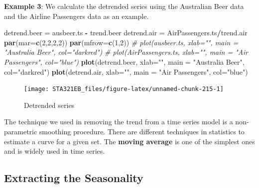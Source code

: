 \documentclass[
]{book}
\newenvironment{Shaded}{\begin{snugshade}}{\end{snugshade}}
\newcommand{\AttributeTok}[1]{\textcolor[rgb]{0.13,0.29,0.53}{#1}}
\newcommand{\CommentTok}[1]{\textcolor[rgb]{0.56,0.35,0.01}{\textit{#1}}}
\newcommand{\DecValTok}[1]{\textcolor[rgb]{0.00,0.00,0.81}{#1}}
\newcommand{\FunctionTok}[1]{\textcolor[rgb]{0.13,0.29,0.53}{\textbf{#1}}}
\newcommand{\NormalTok}[1]{#1}
\newcommand{\OtherTok}[1]{\textcolor[rgb]{0.56,0.35,0.01}{#1}}
\newcommand{\SpecialCharTok}[1]{\textcolor[rgb]{0.81,0.36,0.00}{\textbf{#1}}}
\newcommand{\StringTok}[1]{\textcolor[rgb]{0.31,0.60,0.02}{#1}}
\begin{document}
\textbf{Example 3}: We calculate the detrended series using the Australian Beer data and the Airline Passengers data as an example.

\begin{Shaded}
\begin{Highlighting}[]
\NormalTok{detrend.beer }\OtherTok{=}\NormalTok{ ausbeer.ts }\SpecialCharTok{{-}}\NormalTok{ trend.beer}
\NormalTok{detrend.air }\OtherTok{=}\NormalTok{ AirPassengers.ts}\SpecialCharTok{/}\NormalTok{trend.air}
\FunctionTok{par}\NormalTok{(}\AttributeTok{mar=}\FunctionTok{c}\NormalTok{(}\DecValTok{2}\NormalTok{,}\DecValTok{2}\NormalTok{,}\DecValTok{2}\NormalTok{,}\DecValTok{2}\NormalTok{))}
\FunctionTok{par}\NormalTok{(}\AttributeTok{mfrow=}\FunctionTok{c}\NormalTok{(}\DecValTok{1}\NormalTok{,}\DecValTok{2}\NormalTok{))}
\CommentTok{\# plot(ausbeer.ts, xlab="", main = "Australia Beer", col="darkred")}
\CommentTok{\# plot(AirPassengers.ts, xlab="", main = "Air Passengers", col="blue")}
\FunctionTok{plot}\NormalTok{(detrend.beer, }\AttributeTok{xlab=}\StringTok{""}\NormalTok{, }\AttributeTok{main =} \StringTok{"Australia Beer"}\NormalTok{, }\AttributeTok{col=}\StringTok{"darkred"}\NormalTok{)}
\FunctionTok{plot}\NormalTok{(detrend.air, }\AttributeTok{xlab=}\StringTok{""}\NormalTok{, }\AttributeTok{main =} \StringTok{"Air Passengers"}\NormalTok{, }\AttributeTok{col=}\StringTok{"blue"}\NormalTok{)}
\end{Highlighting}
\end{Shaded}

\begin{figure}

{\centering \texttt{[image: STA321EB\_files/figure-latex/unnamed-chunk-215-1]} 

}

\caption{Detrended series}\label{fig:unnamed-chunk-215}
\end{figure}

The technique we used in removing the trend from a time series model is a non-parametric smoothing procedure. There are different techniques in statistics to estimate a curve for a given set. The \textbf{moving average} is one of the simplest ones and is widely used in time series.

\hypertarget{extracting-the-seasonality}{%
\subsection{Extracting the Seasonality}\label{extracting-the-seasonality}}
\end{document}
